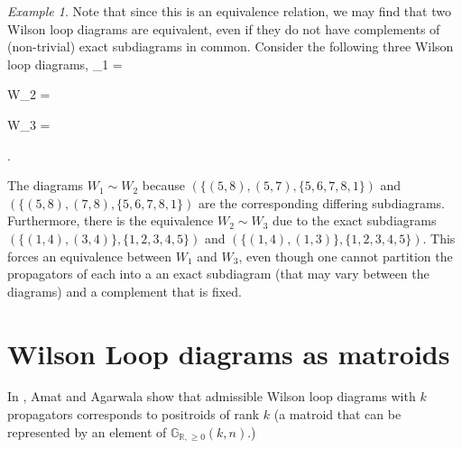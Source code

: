 \documentclass[11pt]{article}
\newcommand{\drawWLD}[2]{

\pgfmathsetmacro{\n}{#1}
\pgfmathsetmacro{\radius}{#2}
\pgfmathsetmacro{\angle}{360/\n}
    \foreach \i in {1,2,...,\n} {
      \pgfmathsetmacro{\x}{\angle*\i}
        \draw[-,shorten >=-\radius*0.1 cm,shorten <=-\radius*0.1 cm]  (\x:\radius cm)-- (\x + \angle: \radius cm);
    }

\draw (\angle:\radius) node {$\bullet$};
}
\newcommand{\drawprop}[4]{
\pgfmathsetmacro{\r}{#1}
\pgfmathsetmacro{\bumpr}{#2}
\pgfmathsetmacro{\s}{#3}
\pgfmathsetmacro{\bumps}{#4}
\pgfmathsetmacro{\perturbe}{\angle/\n}

\begin{scope}
\clip (\angle*\r:\radius) -- (\angle + \angle*\r:\radius) -- (\angle*\s:\radius) -- (\angle + \angle*\s:\radius) -- (\angle*\r:\radius);
\draw[propagator] (\angle*\r + \angle/2 + \bumpr*\perturbe:\radius) -- (\angle*\s + \angle/2 + \bumps*\perturbe:\radius);
\end{scope}
}
\newcommand{\drawnumbers}{
  \foreach \i in {1,2,...,\n} {
  \pgfmathsetmacro{\x}{\angle*\i}
  \draw (\x:\radius*1.15) node {\footnotesize \i};
}
}
\newcommand{\R}{\mathbb{R}}
\newcommand{\Gr}{\mathbb{G}_{\R, \geq 0}}
\def\bas #1\eas{\begin{align*} #1 \end{align*}}
\theoremstyle{remark}
\newtheorem{eg}[thm]{Example}
\theoremstyle{definition}
\begin{document}
\begin{eg}
Note that since this is an equivalence relation, we may find that two Wilson loop diagrams are equivalent, even if they do not have complements of (non-trivial) exact subdiagrams in common. Consider the following three Wilson loop diagrams,
\bas
W_1 =  \quad
W_2 =  \quad
W_3 =  .
\eas

The diagrams $W_1 \sim W_2$ because $(\{(5,8), (5,7), \{5,6,7,8,1\})$ and $(\{(5,8), (7,8), \{5,6,7,8,1\})$ are the corresponding differing subdiagrams. Furthermore, there is the equivalence $W_2 \sim W_3$ due to the exact subdiagrams $(\{(1,4), (3,4)\}, \{1,2,3,4,5\})$ and $(\{(1,4), (1,3)\}, \{1,2,3,4,5\})$. This forces an equivalence between $W_1$ and $W_3$, even though one cannot partition the propagators of each into a an exact subdiagram (that may vary between the diagrams) and a complement that is fixed.  \end{eg}

\section{Wilson Loop diagrams as matroids}

In \cite{wilsonloop}, Amat and Agarwala show that admissible Wilson loop diagrams with $k$ propagators corresponds to positroids of rank $k$ (a matroid that can be represented by an element of $\Gr(k, n)$.)
\end{document}
